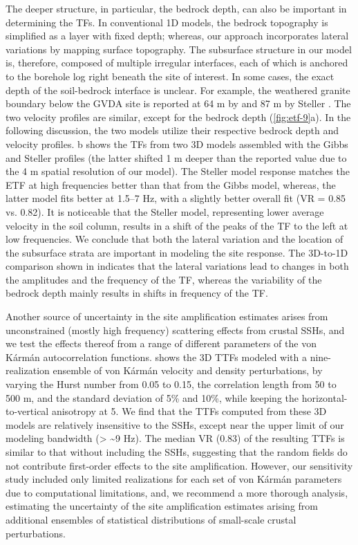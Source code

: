 The deeper structure, in particular, the bedrock depth, can also be important in determining the TFs. In conventional 1D models, the bedrock topography is simplified as a layer with fixed depth; whereas, our approach incorporates lateral variations by mapping surface topography. The subsurface structure in our model is, therefore, composed of multiple irregular interfaces, each of which is anchored to the borehole log right beneath the site of interest. In some cases, the exact depth of the soil-bedrock interface is unclear. For example, the weathered granite boundary below the GVDA site is reported at 64 m by \citet{gibbsNearsurfaceSwaveVelocities1989} and 87 m by Steller \citet{stellerNewBoreholeGeophysical1996}. The two velocity profiles are similar, except for the bedrock depth (\cref{fig:etf-9}a). In the following discussion, the two models utilize their respective bedrock depth and velocity profiles. b shows the TFs from two 3D models assembled with the Gibbs and Steller profiles (the latter shifted 1 m deeper than the reported value due to the 4 m spatial resolution of our model). The Steller model response matches the ETF at high frequencies better than that from the Gibbs model, whereas, the latter model fits better at 1.5–7 Hz, with a slightly better overall fit (VR = 0.85 vs. 0.82). It is noticeable that the Steller model, representing lower average velocity in the soil column, results in a shift of the peaks of the TF to the left at low frequencies. We conclude that both the lateral variation and the location of the subsurface strata are important in modeling the site response. The 3D-to-1D comparison shown in  indicates that the lateral variations lead to changes in both the amplitudes and the frequency of the TF, whereas the variability of the bedrock depth mainly results in shifts in frequency of the TF.

Another source of uncertainty in the site amplification estimates arises from unconstrained (mostly high frequency) scattering effects from crustal SSHs, and we test the effects thereof from a range of different parameters of the von K\'arm\'an autocorrelation functions.  shows the 3D TTFs modeled with a nine-realization ensemble of von K\'arm\'an velocity and density perturbations, by varying the Hurst number from 0.05 to 0.15, the correlation length from 50 to 500 m, and the standard deviation of 5\% and 10\%, while keeping the horizontal-to-vertical anisotropy at 5. We find that the TTFs computed from these 3D models are relatively insensitive to the SSHs, except near the upper limit of our modeling bandwidth (> \textasciitilde 9 Hz). The median VR (0.83) of the resulting TTFs is similar to that without including the SSHs, suggesting that the random fields do not contribute first-order effects to the site amplification. However, our sensitivity study included only limited realizations for each set of von K\'arm\'an parameters due to computational limitations, and, we recommend a more thorough analysis, estimating the uncertainty of the site amplification estimates arising from additional ensembles of statistical distributions of small-scale crustal perturbations.

